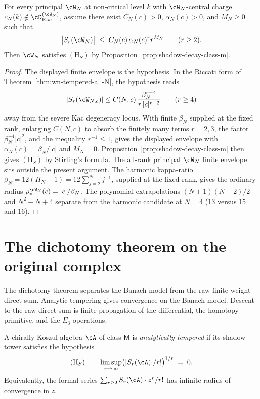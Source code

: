 \begin{theorem}
\label{conj:shadow-decay-class-m-full-family}
For every principal $\cW_N$ at non-critical level $k$ with
$\cW_N$-central charge $c_N(k) \notin \cD_{\mathrm{Kac}}^{(\cW_N)}$,
assume there exist $C_N(c)>0$, $\alpha_N(c)>0$, and $M_N\ge 0$ such that
\[
 \bigl\lvert S_r(\cW_N) \bigr\rvert
 \;\le\;
 C_N(c)\,\alpha_N(c)^r r^{M_N}
 \qquad (r \ge 2).
\]
Then $\cW_N$ satisfies $(\mathrm{H}_S)$ by
Proposition~\ref{prop:shadow-decay-class-m}.
\end{theorem}

\begin{proof}
The displayed finite envelope is the hypothesis. In the Riccati form of
Theorem~\ref{thm:wn-tempered-all-N}, the hypothesis reads
\[
 \lvert S_r(\cW_{N,c})\rvert
 \le
 C(N,c)\,\frac{\beta_N^{r-4}}{r\,|c|^{r-2}}
 \qquad (r\ge 4)
\]
away from the severe Kac degeneracy locus. With finite $\beta_N$
supplied at the fixed rank, enlarging $C(N,c)$ to absorb the finitely
many terms $r=2,3$, the factor $\beta_N^{-4}|c|^2$, and the inequality
$r^{-1}\le 1$, gives the displayed envelope with
$\alpha_N(c)=\beta_N/|c|$ and $M_N=0$.
Proposition~\ref{prop:shadow-decay-class-m} then gives $(\mathrm{H}_S)$
by Stirling's formula. The all-rank principal $\cW_N$ finite envelope
sits outside the present argument. The harmonic kappa-ratio
$\beta_N=12(H_N-1)=12\sum_{j=2}^{N}j^{-1}$, supplied at the fixed
rank, gives the ordinary radius
$\rho_*^{\cW_N}(c)=|c|/\beta_N$. The polynomial extrapolations
$(N+1)(N+2)/2$ and $N^2-N+4$ separate from the harmonic candidate at
$N=4$ ($13$ versus $15$ and $16$).
\end{proof}

\section{The dichotomy theorem on the original complex}
\label{sec:original-complex-dichotomy}

The dichotomy theorem separates the Banach model from the raw
finite-weight direct sum. Analytic tempering gives convergence on the
Banach model. Descent to the raw direct sum is finite propagation of
the differential, the homotopy primitive, and the $E_3$ operations.

\begin{definition}
\label{def:analytically-tempered-class-m}
A chirally Koszul algebra $\cA$ of class $\mathsf{M}$ is
\emph{analytically tempered} if its shadow tower satisfies the
hypothesis
\[
 (\mathrm{H}_S) \qquad
 \limsup_{r \to \infty}
 \bigl( \lvert S_r(\cA) \rvert / r! \bigr)^{1/r}
 \;=\; 0.
\]
Equivalently, the formal series
$\sum_{r \ge 2} S_r(\cA) \cdot z^r / r!$ has infinite radius of
convergence in $z$.
\end{definition}

